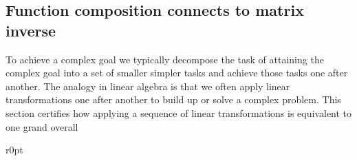 \subsection{Function composition connects to matrix inverse}

To achieve a complex goal we typically decompose the task of attaining the complex goal into a set of smaller simpler tasks and achieve those tasks one after another.
The analogy in linear algebra is that we often apply linear transformations one after another to build up or solve a complex problem.
This section certifies how applying a sequence of linear transformations is equivalent to one grand overall 


\begin{wrapfigure}r{0pt}
\end{wrapfigure}
